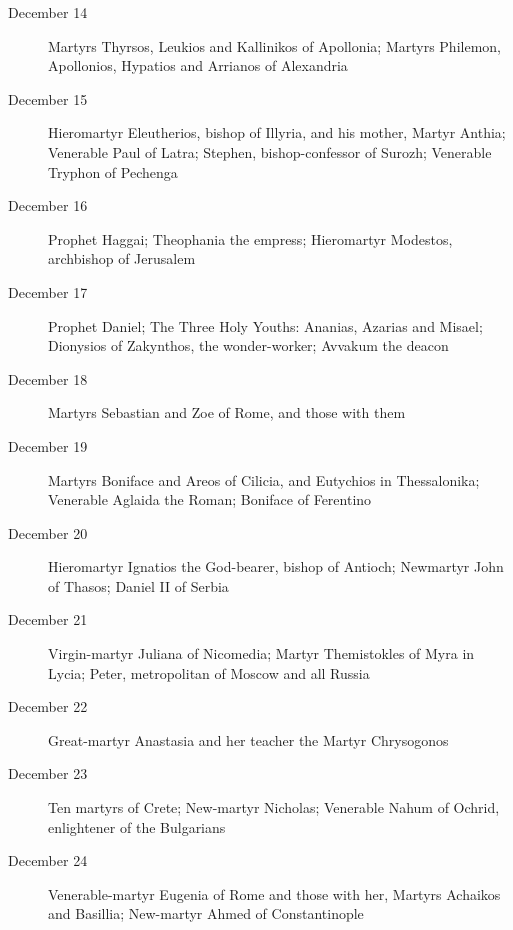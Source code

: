 \begin{description}
\item[December 14]

Martyrs Thyrsos, Leukios and Kallinikos of Apollonia; Martyrs Philemon, Apollonios, Hypatios and Arrianos of Alexandria

\item[December 15]

Hieromartyr Eleutherios, bishop of Illyria, and his mother, Martyr Anthia; Venerable Paul of Latra; Stephen, bishop-confessor of Surozh; Venerable Tryphon of Pechenga

\item[December 16]

Prophet Haggai; Theophania the empress; Hieromartyr Modestos, archbishop of Jerusalem

\item[December 17]

Prophet Daniel; The Three Holy Youths: Ananias, Azarias and Misael; Dionysios of Zakynthos, the wonder-worker; Avvakum the deacon

\item[December 18]

Martyrs Sebastian and Zoe of Rome, and those with them

\item[December 19]

Martyrs Boniface and Areos of Cilicia, and Eutychios in Thessalonika; Venerable Aglaida the Roman; Boniface of Ferentino

\item[December 20]

Hieromartyr Ignatios the God-bearer, bishop of Antioch; Newmartyr John of Thasos; Daniel II of Serbia

\item[December 21]

Virgin-martyr Juliana of Nicomedia; Martyr Themistokles of Myra in Lycia; Peter, metropolitan of Moscow and all Russia

\item[December 22]

Great-martyr Anastasia and her teacher the Martyr Chrysogonos

\item[December 23]

Ten martyrs of Crete; New-martyr Nicholas; Venerable Nahum of Ochrid, enlightener of the Bulgarians

\item[December 24]

Venerable-martyr Eugenia of Rome and those with her, Martyrs Achaikos and Basillia; New-martyr Ahmed of Constantinople


\end{description}
